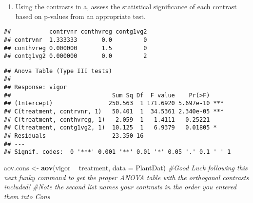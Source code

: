 \documentclass[]{article}
\newenvironment{Shaded}{\begin{snugshade}}{\end{snugshade}}
\newcommand{\KeywordTok}[1]{\textcolor[rgb]{0.13,0.29,0.53}{\textbf{#1}}}
\newcommand{\DataTypeTok}[1]{\textcolor[rgb]{0.13,0.29,0.53}{#1}}
\newcommand{\DecValTok}[1]{\textcolor[rgb]{0.00,0.00,0.81}{#1}}
\newcommand{\StringTok}[1]{\textcolor[rgb]{0.31,0.60,0.02}{#1}}
\newcommand{\CommentTok}[1]{\textcolor[rgb]{0.56,0.35,0.01}{\textit{#1}}}
\newcommand{\OperatorTok}[1]{\textcolor[rgb]{0.81,0.36,0.00}{\textbf{#1}}}
\newcommand{\NormalTok}[1]{#1}
\providecommand{\tightlist}{%
  \setlength{\itemsep}{0pt}\setlength{\parskip}{0pt}}
\begin{document}
\begin{enumerate}
\def\labelenumi{\Alph{enumi})}
\setcounter{enumi}{2}
\tightlist
\item
  Using the contrasts in a, assess the statistical significance of each
  contrast based on p-values from an appropriate test.
\end{enumerate}

\begin{Shaded}
\end{Shaded}

\begin{verbatim}
##           contrvnr conthvreg contg1vg2
## contrvnr  1.333333       0.0         0
## conthvreg 0.000000       1.5         0
## contg1vg2 0.000000       0.0         2
\end{verbatim}

\begin{Shaded}
\end{Shaded}

\begin{verbatim}
## Anova Table (Type III tests)
## 
## Response: vigor
##                             Sum Sq Df  F value    Pr(>F)    
## (Intercept)                250.563  1 171.6920 5.697e-10 ***
## C(treatment, contrvnr, 1)   50.401  1  34.5361 2.340e-05 ***
## C(treatment, conthvreg, 1)   2.059  1   1.4111   0.25221    
## C(treatment, contg1vg2, 1)  10.125  1   6.9379   0.01805 *  
## Residuals                   23.350 16                       
## ---
## Signif. codes:  0 '***' 0.001 '**' 0.01 '*' 0.05 '.' 0.1 ' ' 1
\end{verbatim}

\begin{Shaded}
\begin{Highlighting}[]
\NormalTok{aov.cons <-}\StringTok{ }\KeywordTok{aov}\NormalTok{(vigor }\OperatorTok{~}\StringTok{ }\NormalTok{treatment, }\DataTypeTok{data =}\NormalTok{ PlantDat)}
\CommentTok{#Good Luck following this next funky command to get the proper ANOVA table with the orthogonal contrasts included!}
\CommentTok{#Note the second list names your contrasts in the order you entered them into Cons}
\end{Highlighting}
\end{Shaded}
\end{document}
